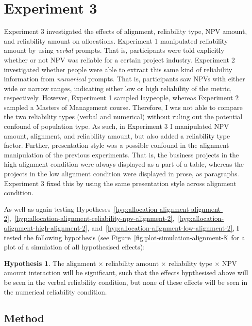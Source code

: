 \documentclass[a4paper, nobind, dvipsnames]{templates/ociamthesis}
\theoremstyle{definition}
\theoremstyle{definition}
\theoremstyle{definition}
\theoremstyle{definition}
\newtheorem{hypothesis}{Hypothesis}[chapter]
\theoremstyle{remark}
\begin{document}
\section{Experiment 3}

Experiment 3 investigated the effects of alignment, reliability type, NPV
amount, and reliability amount on allocations. Experiment 1 manipulated
reliability amount by using \emph{verbal} prompts. That is, participants were told
explicitly whether or not NPV was reliable for a certain project industry.
Experiment 2 investigated whether people were able to extract this same kind of
reliability information from \emph{numerical} prompts. That is, participants saw NPVs
with either wide or narrow ranges, indicating either low or high reliability of
the metric, respectively. However, Experiment 1 sampled laypeople, whereas
Experiment 2 sampled a Masters of Management course. Therefore, I was not able
to compare the two reliability types (verbal and numerical) without ruling out
the potential confound of population type. As such, in Experiment 3 I
manipulated NPV amount, alignment, and reliability amount, but also added a
reliability type factor. Further, presentation style was a possible confound in
the alignment manipulation of the previous experiments. That is, the business
projects in the high alignment condition were always displayed as a part of a
table, whereas the projects in the low alignment condition were displayed in
prose, as paragraphs. Experiment 3 fixed this by using the same presentation
style across alignment condition.

As well as again testing
Hypotheses~\ref{hyp:allocation-alignment-alignment-2},~\ref{hyp:allocation-alignment-reliability-npv-alignment-2},~\ref{hyp:allocation-alignment-high-alignment-2},
and~\ref{hyp:allocation-alignment-low-alignment-2}, I tested the following
hypothesis (see Figure~\ref{fig:plot-simulation-alignment-8} for a plot of a
simulation of all hypothesised effects):

\begin{hypothesis}
\protect\hypertarget{hyp:four-way-alignment-8}{}{\label{hyp:four-way-alignment-8} }The alignment \(\times\) reliability amount \(\times\) reliability type \(\times\) NPV
amount interaction will be significant, such that the effects hypthesised above
will be seen in the verbal reliability condition, but none of these effects
will be seen in the numerical reliability condition.
\end{hypothesis}

\subsection{Method}
\end{document}
